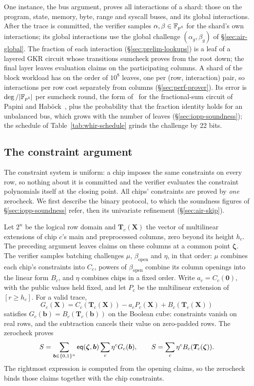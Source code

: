 One \LogUp{} instance, the bus argument, proves all interactions of a shard: those on the program, state, memory, byte, range and syscall buses, and its global interactions. After the trace is committed, the verifier samples $\alpha, \beta \in \mathbb{F}_{p^4}$ for the shard's own interactions; its global interactions use the global challenge $(\alpha_g, \beta_g)$ of \S\ref{sec:air-global}. The fraction of each interaction (\S\ref{sec:prelim-lookups}) is a leaf of a layered GKR circuit whose transitions sumcheck proves from the root down; the final layer leaves evaluation claims on the participating columns. A shard of the block workload has on the order of $10^8$ leaves, one per (row, interaction) pair, so interactions per row cost separately from columns (\S\ref{sec:perf-prover}). Its error is $\deg/|\mathbb{F}_{p^4}|$ per sumcheck round, the form of~\citep[Thm.~4.2.1]{swirl} for the fractional-sum circuit of Papini and Hab\"ock~\citep{logup-gkr}, plus the probability that the fraction identity holds for an unbalanced bus, which grows with the number of leaves (\S\ref{sec:iopp-soundness}); the schedule of Table~\ref{tab:whir-schedule} grinds the \LogUp{} challenge by 22 bits.

\subsection{The constraint argument}
\label{sec:air-zerocheck}

The constraint system is uniform: a chip imposes the same constraints on every row, so nothing about it is committed and the verifier evaluates the constraint polynomials itself at the closing point. All chips' constraints are proved by \emph{one} zerocheck. We first describe the binary protocol, to which the soundness figures of \S\ref{sec:iopp-soundness} refer, then its univariate refinement (\S\ref{sec:air-skip}).

Let $2^n$ be the logical row domain and $\bm T_c(\bm X)$ the vector of multilinear extensions of chip $c$'s main and preprocessed columns, zero beyond its height $h_c$. The preceding \LogUp{} argument leaves claims on these columns at a common point $\bm\zeta$. The verifier samples batching challenges $\mu$, $\beta_{\mathrm{open}}$ and $\eta$, in that order: $\mu$ combines each chip's constraints into $C_c$, powers of $\beta_{\mathrm{open}}$ combine its column openings into the linear form $B_c$, and $\eta$ combines chips in a fixed order. Write $a_c=C_c(\bm 0)$, with the public values held fixed, and let $P_c$ be the multilinear extension of $[r\ge h_c]$. For a valid trace,
\[
  G_c(\bm X)=C_c(\bm T_c(\bm X))-a_cP_c(\bm X)
             +B_c(\bm T_c(\bm X))
\]
satisfies $G_c(\bm b)=B_c(\bm T_c(\bm b))$ on the Boolean cube: constraints vanish on real rows, and the subtraction cancels their value on zero-padded rows. The zerocheck proves
\begin{equation}
\label{eq:zerocheck-seeded}
  S=\sum_{\bm b\in\{0,1\}^n}
       \mathsf{eq}(\bm\zeta,\bm b)\sum_c\eta^cG_c(\bm b),
  \qquad
  S=\sum_c\eta^c B_c(\bm T_c(\bm\zeta)).
\end{equation}
The rightmost expression is computed from the \LogUp{} opening claims, so the zerocheck binds those claims together with the chip constraints.

